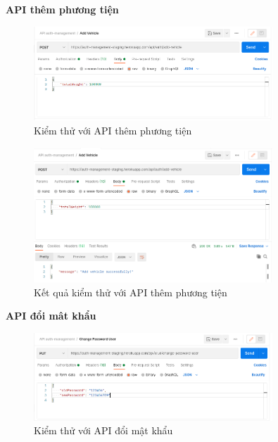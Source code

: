 		\newpage
		
		\textbf{API thêm phương tiện}
		
		\begin{figure}[!ht]
			\includegraphics[width=0.8\textwidth]{Images/testing/API-add-vehicle.png}
			\centering
			\linebreak
			\caption{Kiểm thử với API thêm phương tiện}
		\end{figure}
		
		\begin{figure}[!ht]
			\includegraphics[width=0.8\textwidth]{Images/testing/API-add-vehicle-result.png}
			\centering
			\linebreak
			\caption{Kết quả kiểm thử với API thêm phương tiện}
		\end{figure}
		
		\newpage
		
		\textbf{API đổi mât khẩu}
		
		\begin{figure}[!ht]
			\includegraphics[width=0.8\textwidth]{Images/testing/API-change-password.png}
			\centering
			\linebreak
			\caption{Kiểm thử với API đổi mật khẩu}
		\end{figure}
		
